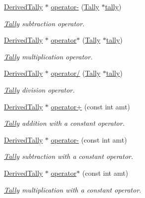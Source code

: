 \begin{DoxyCompactItemize}
\hyperlink{classDerivedTally}{Derived\-Tally} $\ast$ \hyperlink{classTally_afe9c9e2d762ee9cc2776d4d899d7aa97}{operator-\/} (\hyperlink{classTally}{Tally} $\ast$\hyperlink{classTally_a50c7919393799145f1ab23457d47b02b}{tally})
\begin{DoxyCompactList}\small\item\em \hyperlink{classTally}{Tally} subtraction operator. \end{DoxyCompactList}\item 
\hyperlink{classDerivedTally}{Derived\-Tally} $\ast$ \hyperlink{classTally_a1918c9ad0006fb896c78f5acd93e867a}{operator$\ast$} (\hyperlink{classTally}{Tally} $\ast$\hyperlink{classTally_a50c7919393799145f1ab23457d47b02b}{tally})
\begin{DoxyCompactList}\small\item\em \hyperlink{classTally}{Tally} multiplication operator. \end{DoxyCompactList}\item 
\hyperlink{classDerivedTally}{Derived\-Tally} $\ast$ \hyperlink{classTally_ad43cc4bf0bb3a45b6dd79932b172201b}{operator/} (\hyperlink{classTally}{Tally} $\ast$\hyperlink{classTally_a50c7919393799145f1ab23457d47b02b}{tally})
\begin{DoxyCompactList}\small\item\em \hyperlink{classTally}{Tally} division operator. \end{DoxyCompactList}\item 
\hyperlink{classDerivedTally}{Derived\-Tally} $\ast$ \hyperlink{classTally_a98acdc4cdf80878d8b471d347782e40c}{operator+} (const int amt)
\begin{DoxyCompactList}\small\item\em \hyperlink{classTally}{Tally} addition with a constant operator. \end{DoxyCompactList}\item 
\hyperlink{classDerivedTally}{Derived\-Tally} $\ast$ \hyperlink{classTally_ad54fc16952410ff694caf17e5d133ac4}{operator-\/} (const int amt)
\begin{DoxyCompactList}\small\item\em \hyperlink{classTally}{Tally} subtraction with a constant operator. \end{DoxyCompactList}\item 
\hyperlink{classDerivedTally}{Derived\-Tally} $\ast$ \hyperlink{classTally_a4a495bfff886e894a06f3741ef47b0a2}{operator$\ast$} (const int amt)
\begin{DoxyCompactList}\small\item\em \hyperlink{classTally}{Tally} multiplication with a constant operator. \end{DoxyCompactList}\item 

\end{DoxyCompactItemize}
